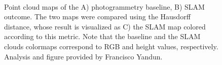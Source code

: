 \begin{figure}[h!]
   \centering
   \\%
   \caption{Point cloud maps of the A) photogrammetry baseline, B) SLAM outcome. The two maps were compared using the Hausdorff distance, whose result is visualized as C) the SLAM map colored according to this metric. Note that the baseline and the SLAM clouds colormaps correspond to RGB and height values, respectively. Analysis and figure provided by Francisco Yandun.}
   \label{fig:results:slam_photogrametry_comparison}                %
\end{figure}

